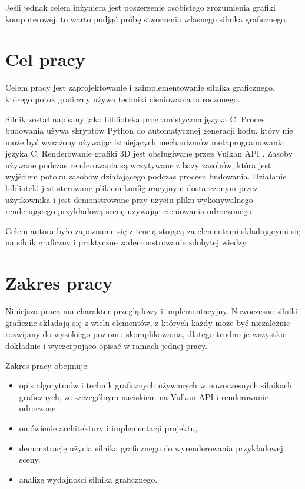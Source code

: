 Jeśli jednak celem inżyniera jest poszerzenie osobistego zrozumienia grafiki komputerowej, to warto podjąć próbę stworzenia własnego silnika graficznego.


\section{Cel pracy}

Celem pracy jest zaprojektowanie i zaimplementowanie silnika graficznego, którego potok graficzny używa techniki cieniowania odroczonego.

Silnik został napisany jako biblioteka programistyczna języka C.
Proces budowania używa skryptów Python do automatycznej generacji kodu, który nie może być wyrażony używając istniejących mechanizmów metaprogramowania języka C.
Renderowanie grafiki 3D jest obsługiwane przez Vulkan API \cite{VULKANSPEC}.
Zasoby używane podczas renderowania są wczytywane z bazy zasobów, która jest wyjściem potoku zasobów działającego podczas procesu budowania.
Działanie biblioteki jest sterowane plikiem konfiguracyjnym dostarczonym przez użytkownika i jest demonstrowane przy użyciu pliku wykonywalnego renderującego przykładową scenę używając cieniowania odroczonego.

Celem autora było zapoznanie się z teorią stojącą za elementami składającymi się na silnik graficzny i praktyczne zademonstrowanie zdobytej wiedzy.


\section{Zakres pracy}

Niniejsza praca ma charakter przeglądowy i implementacyjny. Nowoczesne silniki graficzne składają się z wielu elementów, z których każdy może być niezależnie rozwijany do wysokiego poziomu skomplikowania, dlatego trudno je wszystkie dokładnie i wyczerpująco opisać w ramach jednej pracy.

Zakres pracy obejmuje:
\begin{itemize}
	\item {opis algorytmów i technik graficznych używanych w nowoczesnych silnikach graficznych, ze szczególnym naciskiem na Vulkan API i renderowanie odroczone},
	\item{omówienie architektury i implementacji projektu},
	\item{demonstrację użycia silnika graficznego do wyrenderowania przykładowej sceny},
	\item{analizę wydajności silnika graficznego}.
\end{itemize}

